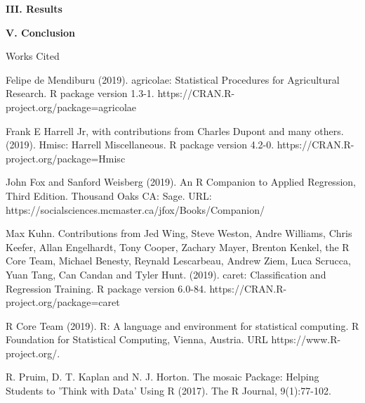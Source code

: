 \documentclass[letter,12pt]{article}
\begin{document}
	\begin{center}
		\textbf{III. Results}\par
	\end{center}
	\justify
	
	
	\begin{center}
		\textbf{V. Conclusion}\par
	\end{center}
	\justify
	
	\newpage
	
	\begin{center}
		Works Cited
	\end{center}
	\raggedright
	\begin{hangparas}{.5in}{1}
		Felipe de Mendiburu (2019). agricolae: Statistical Procedures for Agricultural Research. R package version 1.3-1. https://CRAN.R-project.org/package=agricolae
	\end{hangparas}
	\begin{hangparas}{.5in}{1}
	  Frank E Harrell Jr, with contributions from Charles Dupont and many others. (2019). Hmisc: Harrell Miscellaneous. R package version 4.2-0. https://CRAN.R-project.org/package=Hmisc
	\end{hangparas}
	\begin{hangparas}{.5in}{1}
		John Fox and Sanford Weisberg (2019). An {R} Companion to Applied Regression, Third Edition. Thousand Oaks CA: Sage. URL: https://socialsciences.mcmaster.ca/jfox/Books/Companion/
	\end{hangparas}
	\begin{hangparas}{.5in}{1}
	  Max Kuhn. Contributions from Jed Wing, Steve Weston, Andre Williams, Chris Keefer, Allan Engelhardt, Tony Cooper, Zachary Mayer, Brenton Kenkel, the R Core Team, Michael Benesty, Reynald Lescarbeau, Andrew Ziem, Luca Scrucca, Yuan Tang, Can Candan and Tyler Hunt. (2019). caret: Classification and Regression Training. R package version 6.0-84. https://CRAN.R-project.org/package=caret
	\end{hangparas}
	\begin{hangparas}{.5in}{1}
		R Core Team (2019). R: A language and environment for statistical computing. R Foundation for Statistical Computing, Vienna, Austria. URL https://www.R-project.org/.
	\end{hangparas}
	\begin{hangparas}{.5in}{1}
		R. Pruim, D. T. Kaplan and N. J. Horton. The mosaic Package: Helping Students to 'Think with Data' Using R (2017). The R Journal, 9(1):77-102.
	\end{hangparas}
\end{document}
